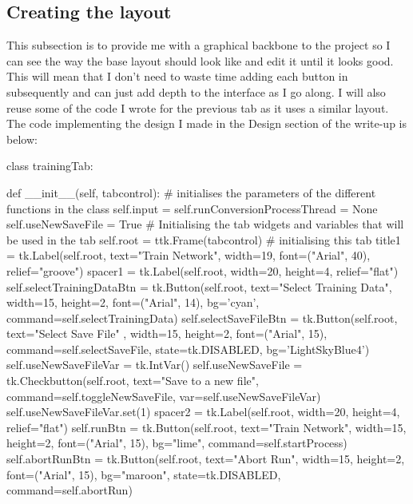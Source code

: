 \documentclass{report}
\begin{document}
\subsection{Creating the layout}
This subsection is to provide me with a graphical backbone to the project so I can see the way the base layout should look like and edit it until it looks good. This will mean that I don't need to waste time adding each button in subsequently and can just add depth to the interface as I go along. I will also reuse some of the code I wrote for the previous tab as it uses a similar layout.
\newline
The code implementing the design I made in the Design section of the write-up is below:
\begin{python}
class trainingTab:

    def __init__(self, tabcontrol):
        # initialises the parameters of the different functions in the class
        self.input = self.runConversionProcessThread = None
        self.useNewSaveFile = True
        # Initialising the tab widgets and variables that will be used in the tab
        self.root = ttk.Frame(tabcontrol)  # initialising this tab
        title1 = tk.Label(self.root, text="Train Network", width=19,
                            font=("Arial", 40), relief="groove")
        spacer1 = tk.Label(self.root, width=20, height=4,
                            relief="flat")
        self.selectTrainingDataBtn = tk.Button(self.root, text="Select Training Data",
                            width=15, height=2, font=("Arial", 14),
                            bg='cyan', command=self.selectTrainingData)
        self.selectSaveFileBtn = tk.Button(self.root, text="Select Save File"
                                , width=15, height=2, font=("Arial", 15),
                                command=self.selectSaveFile, 
                                state=tk.DISABLED,
                                bg='LightSkyBlue4')
        self.useNewSaveFileVar = tk.IntVar()
        self.useNewSaveFile = tk.Checkbutton(self.root,
                                text="Save to a new file",
                                command=self.toggleNewSaveFile,
                                var=self.useNewSaveFileVar)
        self.useNewSaveFileVar.set(1)
        spacer2 = tk.Label(self.root, width=20, height=4,
                           relief="flat")
        self.runBtn = tk.Button(self.root, text="Train Network", width=15, height=2,
                                font=("Arial", 15), bg="lime",
                                command=self.startProcess)
        self.abortRunBtn = tk.Button(self.root, text="Abort Run", width=15,
                                height=2, font=("Arial", 15),
                                bg="maroon", state=tk.DISABLED,
                                command=self.abortRun)


\end{python}
\end{document}
